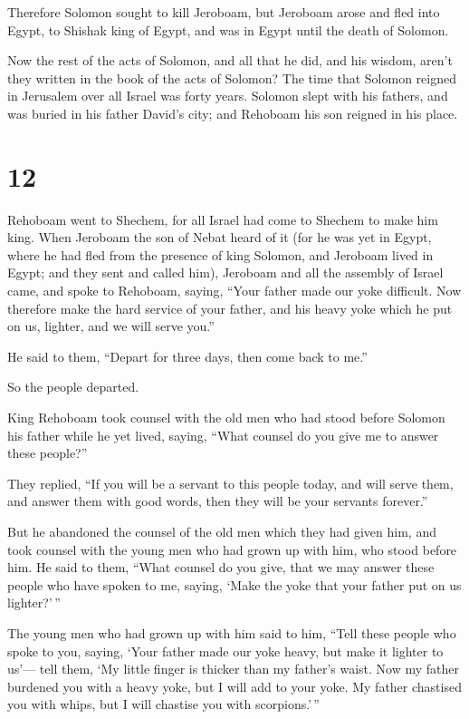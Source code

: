  Therefore Solomon sought to kill Jeroboam, but Jeroboam
arose and fled into Egypt, to Shishak king of Egypt, and was in Egypt
until the death of Solomon.

 Now the rest of the acts of Solomon, and all that he
did, and his wisdom, aren't they written in the book of the acts of
Solomon?  The time that Solomon reigned in Jerusalem over
all Israel was forty years.  Solomon slept with his
fathers, and was buried in his father David's city; and Rehoboam his son
reigned in his place.

\hypertarget{section-11}{%
\section{12}\label{section-11}}

 Rehoboam went to Shechem, for all Israel had come to
Shechem to make him king.  When Jeroboam the son of Nebat
heard of it (for he was yet in Egypt, where he had fled from the
presence of king Solomon, and Jeroboam lived in Egypt; 
and they sent and called him), Jeroboam and all the assembly of Israel
came, and spoke to Rehoboam, saying,  ``Your father made
our yoke difficult. Now therefore make the hard service of your father,
and his heavy yoke which he put on us, lighter, and we will serve you.''

 He said to them, ``Depart for three days, then come back
to me.''

So the people departed.

 King Rehoboam took counsel with the old men who had stood
before Solomon his father while he yet lived, saying, ``What counsel do
you give me to answer these people?''

 They replied, ``If you will be a servant to this people
today, and will serve them, and answer them with good words, then they
will be your servants forever.''

 But he abandoned the counsel of the old men which they
had given him, and took counsel with the young men who had grown up with
him, who stood before him.  He said to them, ``What
counsel do you give, that we may answer these people who have spoken to
me, saying, `Make the yoke that your father put on us lighter?'\,''

 The young men who had grown up with him said to him,
``Tell these people who spoke to you, saying, `Your father made our yoke
heavy, but make it lighter to us'--- tell them, `My little finger is
thicker than my father's waist.  Now my father burdened
you with a heavy yoke, but I will add to your yoke. My father chastised
you with whips, but I will chastise you with scorpions.'\,''

